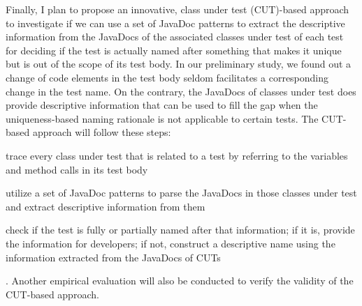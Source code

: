 Finally, I plan to propose an innovative, class under test (CUT)-based approach to investigate if we can use a set of JavaDoc patterns to extract the descriptive information from the JavaDocs of the associated classes under test of each test for deciding if the test is actually named after something that makes it unique but is out of the scope of its test body.
%
In our preliminary study, we found out a change of code elements in the test body seldom facilitates a corresponding change in the test name.
%
On the contrary, the JavaDocs of classes under test does provide descriptive information that can be used to fill the gap when the uniqueness-based naming rationale is not applicable to certain tests.
%
The CUT-based approach will follow these steps:
\begin{enumerate*}
\item trace every class under test that is related to a test by referring to the variables and method calls in its test body
\item utilize a set of JavaDoc patterns to parse the JavaDocs in those classes under test and extract descriptive information from them
\item check if the test is fully or partially named after that information; if it is, provide the information for developers; if not, construct a descriptive name using the information extracted from the JavaDocs of CUTs
\end{enumerate*}.
%
Another empirical evaluation will also be conducted to verify the validity of the CUT-based approach.